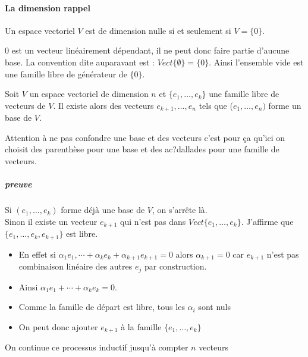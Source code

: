 \paragraph{La dimension rappel}

\begin{definition}
    Un espace vectoriel $V$ est de dimension nulle si et seulement si $V = \{0\}$.
\end{definition}
0 est un vecteur linéairement dépendant, il ne peut donc faire partie d'aucune base. La convention dite auparavant est : $Vect\{\emptyset\} = \{0\}$. Ainsi l'ensemble vide est une famille libre de générateur de $\{0\}$.

\begin{theoreme}
    Soit $V$ un espace vectoriel de dimension $n$ et $\{e_1, \dots, e_k\}$ une famille libre de vecteurs de $V$. Il existe alors des vecteurs $e_{k+1}, \dots, e_n$ tels que ($e_1, \dots, e_n)$ forme un base de $V$.
\end{theoreme}
\begin{framedremark}
    Attention à ne pas confondre une base et des vecteurs c'est pour ça qu'ici on choisit des parenthèse pour une base et des ac?dallades pour une famille de vecteurs.
\end{framedremark}

\subparagraph{preuve} Si $(e_1, \dots, e_k)$ forme déjà une base de $V$, on s'arrête là.\\
Sinon il existe un vecteur $e_{k+1}$ qui n'est pas dans $Vect\{e_1, \dots, e_k\}$. J'affirme que $\{e_1, \dots, e_k, e_{k+1}\}$ est libre.
\\
\begin{itemize}
    \item En effet si $\alpha_1e_1, \cdots + \alpha_ke_k + \alpha_{k+1}e_{k+1} = 0$ alors $\alpha_{k+1} = 0$ car $e_{k+1}$ n'est pas combinaison linéaire des autres $e_j$ par construction.
    \item Ainsi $\alpha_1e_1 + \cdots + \alpha_ke_k  = 0$.
    \item Comme la famille de départ est libre, tous les $\alpha_i$ sont nuls
    \item On peut donc ajouter $e_{k+1}$ à la famille $\{e_1, \dots, e_k\}$
\end{itemize}
On continue ce processus inductif jusqu'à compter $n$ vecteurs


